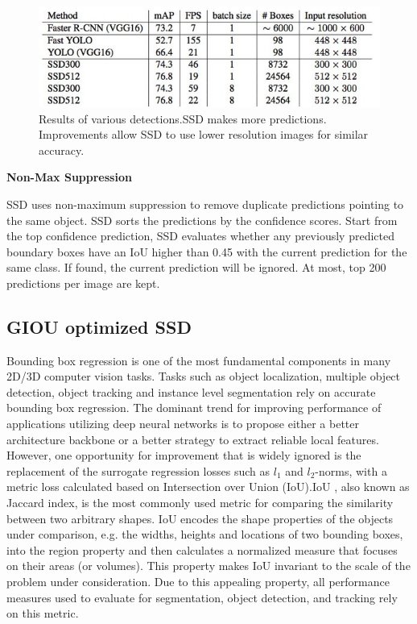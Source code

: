 \documentclass[12pt]{article}
\begin{document}
\begin{figure}[h]
    \centering
    \includegraphics[scale=0.58]{inference_time.jpeg}
    \caption{Results of various detections.SSD makes more predictions. Improvements allow SSD to use lower resolution images for similar accuracy.}
    \label{fig:mesh6}
\end{figure}
\begin{flushleft}
\textbf{Non-Max Suppression}
\end{flushleft}
SSD uses non-maximum suppression to remove duplicate predictions pointing to the same object. SSD sorts the predictions by the confidence scores. Start from the top confidence prediction, SSD evaluates whether any previously predicted boundary boxes have an IoU higher than 0.45 with the current prediction for the same class. If found, the current prediction will be ignored. At most, top 200 predictions per image are kept.



\subsection{GIOU optimized SSD}
Bounding box regression is one of the most fundamental components in many 2D/3D computer vision tasks. Tasks such as object localization, multiple object detection, object tracking and instance level segmentation rely on accurate bounding box regression. The dominant trend for improving performance of applications utilizing deep neural networks is to propose either a better architecture backbone or a better strategy to extract reliable local features. However, one opportunity for improvement that is widely ignored is the replacement of the surrogate regression losses such as $l_{1}$ and $l_{2}$-norms, with a metric loss calculated based on Intersection over Union (IoU).IoU , also known as Jaccard index, is the most commonly used metric for comparing the similarity between two arbitrary shapes. IoU encodes the shape properties of the objects under comparison, e.g. the widths, heights and locations of two bounding boxes, into the region property and then calculates a normalized measure that focuses on their areas (or volumes). This property makes IoU invariant to the scale of the problem under consideration. Due to this appealing property, all performance measures used to evaluate for segmentation, object detection, and tracking rely on this metric.\cite{survey loss}\\
\end{document}
